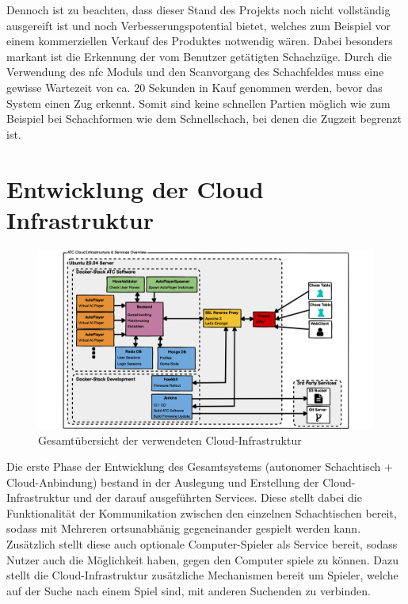 Dennoch ist zu beachten, dass dieser Stand des Projekts noch nicht
vollständig ausgereift ist und noch Verbesserungspotential bietet,
welches zum Beispiel vor einem kommerziellen Verkauf des Produktes
notwendig wären. Dabei besonders markant ist die Erkennung der vom
Benutzer getätigten Schachzüge. Durch die Verwendung des \gls{nfc}
Moduls und den Scanvorgang des Schachfeldes muss eine gewisse Wartezeit
von ca. 20 Sekunden in Kauf genommen werden, bevor das System einen Zug
erkennt. Somit sind keine schnellen Partien möglich wie zum Beispiel bei
Schachformen wie dem Schnellschach, bei denen die Zugzeit begrenzt ist.

\hypertarget{entwicklung-der-cloud-infrastruktur}{%
\chapter{Entwicklung der Cloud
Infrastruktur}\label{entwicklung-der-cloud-infrastruktur}}

\begin{figure}
\centering
\includegraphics{images/ATC_Cloud_Architecture.png}
\caption{Gesamtübersicht der verwendeten Cloud-Infrastruktur
\label{ATC_Cloud_Architecture}}
\end{figure}

Die erste Phase der Entwicklung des Gesamtsystems (autonomer Schachtisch
+ Cloud-Anbindung) bestand in der Auslegung und Erstellung der
Cloud-Infrastruktur und der darauf ausgeführten Services. Diese stellt
dabei die Funktionalität der Kommunikation zwischen den einzelnen
Schachtischen bereit, sodass mit Mehreren ortsunabhänig gegeneinander
gespielt werden kann. Zusätzlich stellt diese auch optionale
Computer-Spieler als Service bereit, sodass Nutzer auch die Möglichkeit
haben, gegen den Computer spiele zu können. Dazu stellt die
Cloud-Infrastruktur zusätzliche Mechanismen bereit um Spieler, welche
auf der Suche nach einem Spiel sind, mit anderen Suchenden zu verbinden.


